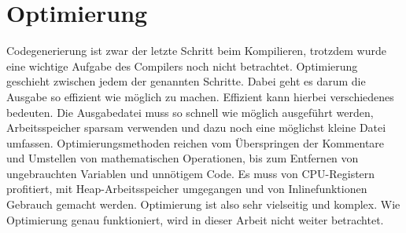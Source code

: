 \section{Optimierung}
Codegenerierung ist zwar der letzte Schritt beim Kompilieren, trotzdem wurde eine wichtige Aufgabe des Compilers noch nicht betrachtet.
Optimierung geschieht zwischen jedem der genannten Schritte.
Dabei geht es darum die Ausgabe so effizient wie möglich zu machen. Effizient kann hierbei verschiedenes bedeuten.
Die Ausgabedatei muss so schnell wie möglich ausgeführt werden, Arbeitsspeicher sparsam verwenden und dazu noch eine möglichst kleine Datei umfassen. 
Optimierungsmethoden reichen vom Überspringen der Kommentare und Umstellen von mathematischen Operationen, bis zum Entfernen von ungebrauchten Variablen und unnötigem Code.
Es muss von CPU-Registern profitiert, mit Heap-Arbeitsspeicher umgegangen und von Inlinefunktionen Gebrauch gemacht werden. %
Optimierung ist also sehr vielseitig und komplex.
Wie Optimierung genau funktioniert, wird in dieser Arbeit nicht weiter betrachtet.
